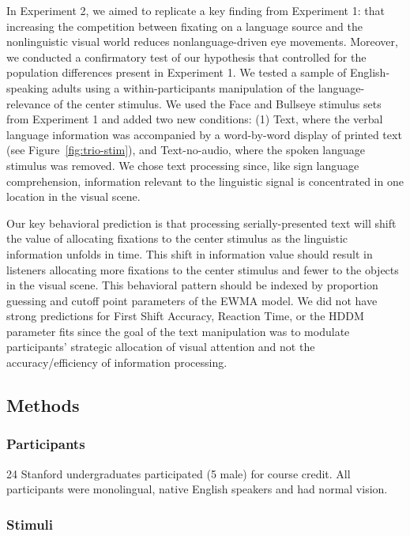 \documentclass[english,floatsintext,man]{apa6}
\begin{document}
In Experiment 2, we aimed to replicate a key finding from Experiment 1:
that increasing the competition between fixating on a language source
and the nonlinguistic visual world reduces nonlanguage-driven eye
movements. Moreover, we conducted a confirmatory test of our hypothesis
that controlled for the population differences present in Experiment 1.
We tested a sample of English-speaking adults using a
within-participants manipulation of the language-relevance of the center
stimulus. We used the Face and Bullseye stimulus sets from Experiment 1
and added two new conditions: (1) Text, where the verbal language
information was accompanied by a word-by-word display of printed text
(see Figure~\ref{fig:trio-stim}), and Text-no-audio, where the spoken
language stimulus was removed. We chose text processing since, like sign
language comprehension, information relevant to the linguistic signal is
concentrated in one location in the visual scene.

Our key behavioral prediction is that processing serially-presented text
will shift the value of allocating fixations to the center stimulus as
the linguistic information unfolds in time. This shift in information
value should result in listeners allocating more fixations to the center
stimulus and fewer to the objects in the visual scene. This behavioral
pattern should be indexed by proportion guessing and cutoff point
parameters of the EWMA model. We did not have strong predictions for
First Shift Accuracy, Reaction Time, or the HDDM parameter fits since
the goal of the text manipulation was to modulate participants'
strategic allocation of visual attention and not the accuracy/efficiency
of information processing.

\hypertarget{methods-1}{%
\subsection{Methods}\label{methods-1}}

\hypertarget{participants-1}{%
\subsubsection{Participants}\label{participants-1}}

24 Stanford undergraduates participated (5 male) for course credit. All
participants were monolingual, native English speakers and had normal
vision.

\hypertarget{stimuli-1}{%
\subsubsection{Stimuli}\label{stimuli-1}}
\end{document}
